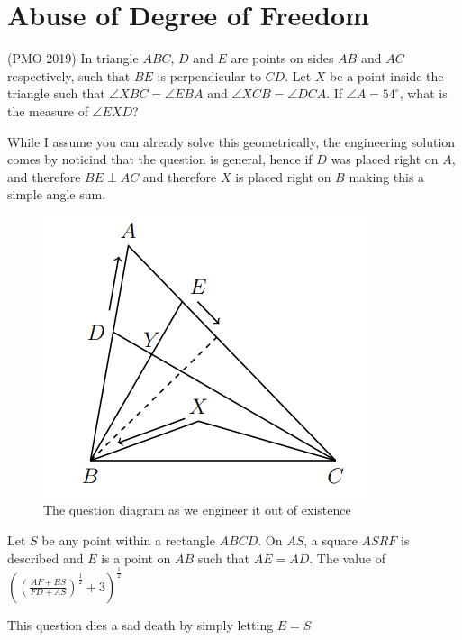 \section{Abuse of Degree of Freedom}
\begin{example}
(PMO 2019) In triangle $ABC$, $D$ and $E$ are points on sides $AB$ and $AC$ respectively, such that $BE$ is perpendicular to $CD$. Let $X$ be a point inside the triangle such that $\angle XBC = \angle EBA$ and $\angle XCB = \angle DCA$. If $\angle A = 54^\circ$, what is the measure of $\angle EXD$?
\end{example}
While I assume you can already solve this geometrically, the engineering solution comes by noticind that the question is general, hence if $D$ was placed right on $A$, and therefore $BE \perp AC$ and therefore $X$ is placed right on $B$ making this a simple angle sum.
\begin{figure} [h]
    \centering
    \includegraphics[width=0.5\linewidth]{Photos/PMO 2019 III 4.png}
    \caption{The question diagram as we engineer it out of existence}
    
\end{figure}
\begin{example}
    Let $S$ be any point within a rectangle $ABCD$. On $AS$, a square $ASRF$ is described and $E$ is a point on $AB$ such that $AE = AD$. The value of $((\frac{AF+ES}{FD+AS})^{\frac{1}{2}}+3)^{\frac{1}{2}}$
\end{example}
This question dies a sad death by simply letting $E=S$\\
